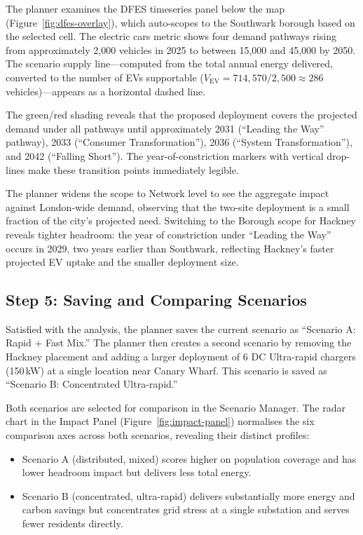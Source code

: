 The planner examines the DFES timeseries panel below the map (Figure~\ref{fig:dfes-overlay}), which auto-scopes to the Southwark borough based on the selected cell. The electric cars metric shows four demand pathways rising from approximately 2,000 vehicles in 2025 to between 15,000 and 45,000 by 2050. The scenario supply line---computed from the total annual energy delivered, converted to the number of EVs supportable ($V_{\text{EV}} = 714{,}570 / 2{,}500 \approx 286$ vehicles)---appears as a horizontal dashed line.

The green/red shading reveals that the proposed deployment covers the projected demand under all pathways until approximately 2031 (``Leading the Way'' pathway), 2033 (``Consumer Transformation''), 2036 (``System Transformation''), and 2042 (``Falling Short''). The year-of-constriction markers with vertical drop-lines make these transition points immediately legible.

The planner widens the scope to Network level to see the aggregate impact against London-wide demand, observing that the two-site deployment is a small fraction of the city's projected need. Switching to the Borough scope for Hackney reveals tighter headroom: the year of constriction under ``Leading the Way'' occurs in 2029, two years earlier than Southwark, reflecting Hackney's faster projected EV uptake and the smaller deployment size.

\subsection{Step 5: Saving and Comparing Scenarios}
\label{sec:uc-compare}

Satisfied with the analysis, the planner saves the current scenario as ``Scenario A: Rapid + Fast Mix.'' The planner then creates a second scenario by removing the Hackney placement and adding a larger deployment of 6 DC Ultra-rapid chargers (150\,kW) at a single location near Canary Wharf. This scenario is saved as ``Scenario B: Concentrated Ultra-rapid.''

Both scenarios are selected for comparison in the Scenario Manager. The radar chart in the Impact Panel (Figure~\ref{fig:impact-panel}) normalises the six comparison axes across both scenarios, revealing their distinct profiles:

\begin{itemize}[nosep]
    \item Scenario A (distributed, mixed) scores higher on population coverage and has lower headroom impact but delivers less total energy.
    \item Scenario B (concentrated, ultra-rapid) delivers substantially more energy and carbon savings but concentrates grid stress at a single substation and serves fewer residents directly.
\end{itemize}

